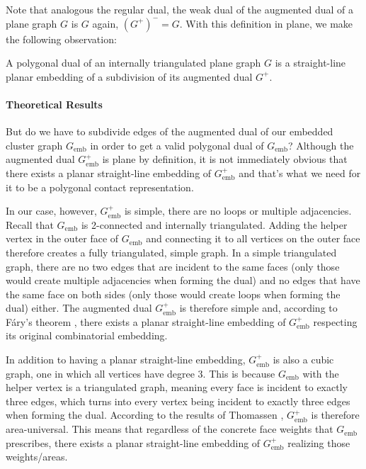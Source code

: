 Note that analogous the regular dual, the weak dual of the augmented dual of a plane graph $G$ is $G$ again, \ie{} $(G^+)^- = G$. With this definition in plane, we make the following observation:

\begin{corollary}
	A polygonal dual of an internally triangulated plane graph $G$ is a straight-line planar embedding of a subdivision of its augmented dual $G^+$.
\end{corollary}


\paragraph{Theoretical Results}

But do we have to subdivide edges of the augmented dual of our embedded cluster graph $G_\text{emb}$ in order to get a valid polygonal dual of $G_\text{emb}$? Although the augmented dual $G_\text{emb}^+$ is plane by definition, it is not immediately obvious that there exists a planar straight-line embedding of $G_\text{emb}^+$ \emdash{} and that's what we need for it to be a polygonal contact representation.

In our case, however, $G_\text{emb}^+$ is simple, \ie{} there are no loops or multiple adjacencies. Recall that $G_\text{emb}$ is 2-connected and internally triangulated. Adding the helper vertex in the outer face of $G_\text{emb}$ and connecting it to all vertices on the outer face therefore creates a fully triangulated, simple graph. In a simple triangulated graph, there are no two edges that are incident to the same faces (only those would create multiple adjacencies when forming the dual) and no edges that have the same face on both sides (only those would create loops when forming the dual) either. The augmented dual $G_\text{emb}^+$ is therefore simple and, according to Fáry's theorem \cite{fary1948straight}, there exists a planar straight-line embedding of $G_\text{emb}^+$ respecting its original combinatorial embedding.

In addition to having a planar straight-line embedding, $G_\text{emb}^+$ is also a cubic graph, \ie{} one in which all vertices have degree 3. This is because $G_\text{emb}$ with the helper vertex is a triangulated graph, meaning every face is incident to exactly three edges, which turns into every vertex being incident to exactly three edges when forming the dual. According to the results of Thomassen \cite{thomassen1992plane}, $G_\text{emb}^+$ is therefore area-universal. This means that regardless of the concrete face weights that $G_\text{emb}$ prescribes, there exists a planar straight-line embedding of $G_\text{emb}^+$ realizing those weights/areas.


